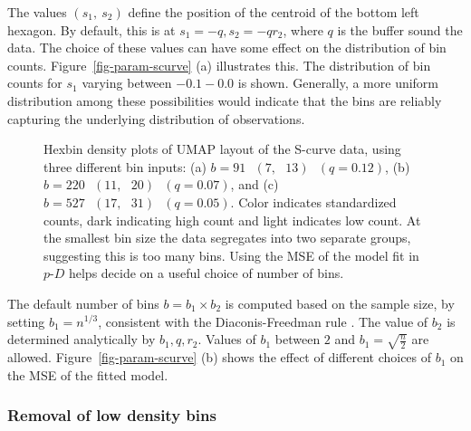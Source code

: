 \documentclass[
  12pt]{article}
\begin{document}
The values \((s_1, \ s_2)\) define the position of the centroid of the
bottom left hexagon. By default, this is at \(s_1 = -q, s_2 = -qr_2\),
where \(q\) is the buffer sound the data. The choice of these values can
have some effect on the distribution of bin counts.
Figure~\ref{fig-param-scurve} (a) illustrates this. The distribution of
bin counts for \(s_1\) varying between \(-0.1-0.0\) is shown. Generally,
a more uniform distribution among these possibilities would indicate
that the bins are reliably capturing the underlying distribution of
observations.

\begin{figure}[H]


\caption{\label{fig-bins-scurve}Hexbin density plots of UMAP layout of
the S-curve data, using three different bin inputs: (a)
\(b = 91 \text{ } (7, \text{ }13)  \text{ }(q = 0.12)\), (b)
\(b = 220 \text{ } (11, \text{ }20) \text{ }(q = 0.07)\), and (c)
\(b = 527 \text{ } (17, \text{ }31) \text{ }(q = 0.05)\). Color
indicates standardized counts, dark indicating high count and light
indicates low count. At the smallest bin size the data segregates into
two separate groups, suggesting this is too many bins. Using the MSE of
the model fit in \(p\text{-}D\) helps decide on a useful choice of
number of bins.}

\end{figure}%

The default number of bins \(b=b_1\times b_2\) is computed based on the
sample size, by setting \(b_1=n^{1/3}\), consistent with the
Diaconis-Freedman rule \citep{freedman1981}. The value of \(b_2\) is
determined analytically by \(b_1, q, r_2\). Values of \(b_1\) between
\(2\) and \(b_1 = \sqrt{\frac{n}{2}}\) are allowed.
Figure~\ref{fig-param-scurve} (b) shows the effect of different choices
of \(b_1\) on the MSE of the fitted model.

\subsubsection{Removal of low density
bins}\label{removal-of-low-density-bins}
\end{document}
